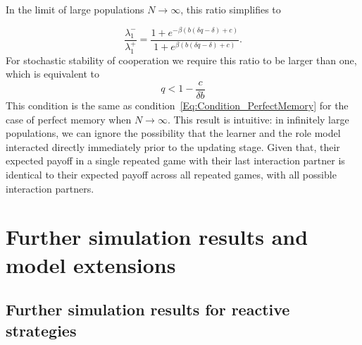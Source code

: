\documentclass[11pt]{article}
\theoremstyle{plainCl1}
\theoremstyle{plainCl2}
\begin{document}
\noindent
In the limit of large populations \(N \rightarrow \infty \), this ratio simplifies to

\begin{equation}
  \frac{\lambda^{-}_1}{\lambda^{+}_1} =
  \frac{1 + e^{- \beta \left(b \left(\delta q - \delta\right) + c\right)}}{1 + e^{\beta \left(b \left(\delta q - \delta\right) + c\right)}}.
\end{equation}
For stochastic stability of cooperation we require this ratio to be larger than one, which is equivalent to
\begin{equation} \label{Eq:Condition_OneInteractionExpectedPayoff}
  q<1 - \frac{c}{\delta b}
\end{equation}
This condition is the same as condition~\eqref{Eq:Condition_PerfectMemory} for the case of perfect memory when $N\! \rightarrow\! \infty$. This result is intuitive: in infinitely large populations, we can ignore the possibility that the learner and the role model interacted directly immediately prior to the updating stage. Given that, their expected payoff in a single repeated game with their last interaction partner is identical to their expected payoff across all repeated games, with all possible interaction partners. 
\clearpage




\section{Further simulation results and model extensions}
\label{section:furthersimulations}


\subsection{Further simulation results for reactive strategies}\label{section:simulation_results}
\end{document}
